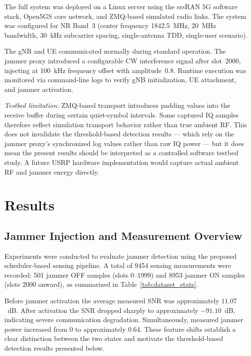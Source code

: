 \documentclass[conference]{IEEEtran}
\begin{document}
The full system was deployed on a Linux server using the srsRAN 5G
software stack, Open5GS core network, and ZMQ-based simulated radio links.
The system was configured for NR Band~3 (center frequency 1842.5~MHz,
20~MHz bandwidth, 30~kHz subcarrier spacing, single-antenna TDD,
single-user scenario).

The gNB and UE communicated normally during standard operation. The jammer
proxy introduced a configurable CW interference signal after slot~2000,
injecting at 100~kHz frequency offset with amplitude~0.8. Runtime
execution was monitored via command-line logs to verify gNB
initialization, UE attachment, and jammer activation.


\textit{Testbed limitation:} ZMQ-based transport introduces padding values
into the receive buffer during certain quiet-symbol intervals. Some
captured IQ samples therefore reflect simulation transport behavior rather
than true ambient RF. This does not invalidate the threshold-based
detection results — which rely on the jammer proxy's synchronized log
values rather than raw IQ power — but it does mean the present results
should be interpreted as a controlled software testbed study. A future
USRP hardware implementation would capture actual ambient RF and jammer
energy directly.


\section{Results}

\subsection{Jammer Injection and Measurement Overview}

Experiments were conducted to evaluate jammer detection using the proposed
scheduler-based sensing pipeline. A total of 9454 sensing measurements
were recorded: 501 jammer OFF samples (slots 0--1999) and 8953 jammer ON
samples (slots 2000 onward), as summarized in Table~\ref{tab:dataset_stats}.

Before jammer activation the average measured SNR was approximately
$11.07$~dB. After activation the SNR dropped sharply to approximately
$-91.10$~dB, indicating severe communication degradation. Simultaneously,
measured jammer power increased from 0 to approximately 0.64. These
feature shifts establish a clear distinction between the two states and
motivate the threshold-based detection results presented below.
\end{document}
